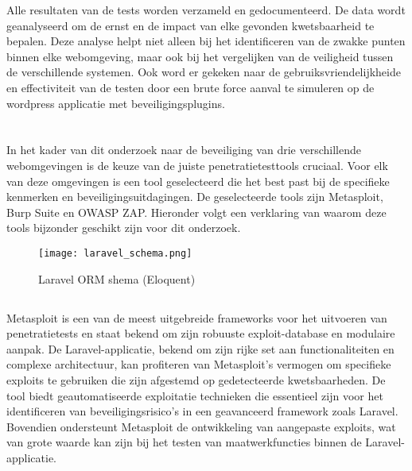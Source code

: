 Alle resultaten van de tests worden verzameld en gedocumenteerd. De data wordt geanalyseerd 
om de ernst en de impact van elke gevonden kwetsbaarheid te bepalen. Deze analyse helpt niet alleen bij 
het identificeren van de zwakke punten binnen elke webomgeving, maar ook bij het vergelijken van de 
veiligheid tussen de verschillende systemen. Ook word er gekeken naar de gebruiksvriendelijkheide en 
effectiviteit van de testen door een brute force aanval te simuleren op de wordpress applicatie met beveiligingsplugins.

\section{}
In het kader van dit onderzoek naar de beveiliging van drie verschillende webomgevingen is de keuze van 
de juiste penetratietesttools cruciaal. Voor elk van deze omgevingen is een tool geselecteerd die het 
best past bij de specifieke kenmerken en beveiligingsuitdagingen. De geselecteerde tools zijn 
Metasploit, Burp Suite en OWASP ZAP. Hieronder volgt een verklaring van waarom deze tools 
bijzonder geschikt zijn voor dit onderzoek.
\begin{figure}
    \centering
    \texttt{[image: laravel\_schema.png]}
    \caption[Laravel ORM schema (Eloquent)]{Laravel ORM shema (Eloquent)}
\end{figure}
\subsection{}
Metasploit is een van de meest uitgebreide frameworks voor het uitvoeren van penetratietests en 
staat bekend om zijn robuuste exploit-database en modulaire aanpak. De Laravel-applicatie, bekend 
om zijn rijke set aan functionaliteiten en complexe architectuur, kan profiteren van Metasploit's 
vermogen om specifieke exploits te gebruiken die zijn afgestemd op gedetecteerde kwetsbaarheden. 
De tool biedt geautomatiseerde exploitatie technieken die essentieel zijn voor het identificeren 
van beveiligingsrisico's in een geavanceerd framework zoals Laravel. Bovendien ondersteunt 
Metasploit de ontwikkeling van aangepaste exploits, wat van grote waarde kan zijn bij 
het testen van maatwerkfuncties binnen de Laravel-applicatie.


